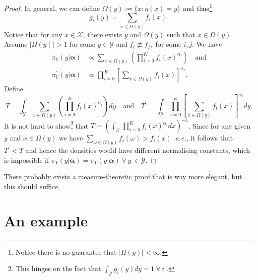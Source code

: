 \documentclass[a4paper, notitlepage, 10pt]{article}
\begin{document}
\begin{proof}
 In general, we can define $\Omega(y) := \{ x: \eta(x) = y \}$ and thus\footnote{Notice there is no guarantee that $|\Omega(y)| < \infty$.} 
\begin{equation}
 g_i(y) = \sum_{x \in \Omega(y)} f_i(x).
\end{equation}
Notice that for any $x \in \mathcal{X}$, there exists $y$ and $\Omega(y)$ such that $x \in \Omega(y)$. 
Assume $|\Omega(y)| > 1$ for some $y \in \mathcal{Y}$ and $f_i \not\equiv f_j,$ for some $i, j$.
We have
\begin{align}
\label{eq:generalTransf}
\pi_{Y}(y |\boldsymbol\alpha) &\propto \sum_{x \in \Omega(y)}\left(\prod_{i=0}^K f_i(x)^{\alpha_i}\right) \quad \text{and}\\
\pi^{\prime}_{Y}(y|\boldsymbol\alpha) &\propto \prod_{i=0}^K\left[\sum_{x \in \Omega(y)} f_i(x)\right]^{\alpha_i}.
\end{align}
Define 
\begin{equation*}
 T = \int_{\mathcal{Y}} \sum_{x \in \Omega(y)}\left(\prod_{i=0}^K f_i(x)^{\alpha_i}\right)dy \quad \text{and} \quad T^{\prime}= \int_{\mathcal{Y}} \prod_{i=0}^K\left[\sum_{x \in \Omega(y)} f_i(x)\right]^{\alpha_i} dy.
\end{equation*}
It is not hard to show\footnote{This hinges on the fact that $\int_{\mathcal{Y}} g_i(y) dy = 1 \: \forall \: i$ .} that $T = \left(\int_{\mathcal{X}} \prod_{i=0}^K f_i(x)^{\alpha_i} dx\right)^{-1}$.
Since for any given $y$ and $x \in \Omega(y)$ we have $\sum_{\omega \in \Omega(y)} f_i(\omega) > f_i(x)$~\textit{a.e.}, it follows that $T^\prime < T$ and hence the densities would have different normalising constants, which is impossible if $\pi_{Y}(y |\boldsymbol\alpha) = \pi_{Y}^\prime(y |\boldsymbol\alpha) \: \forall \: y \: \in \mathcal{Y}$.
\end{proof}
There probably exists a measure-theoretic proof that is way more elegant, but this should suffice.

\section*{An example}
\end{document}
